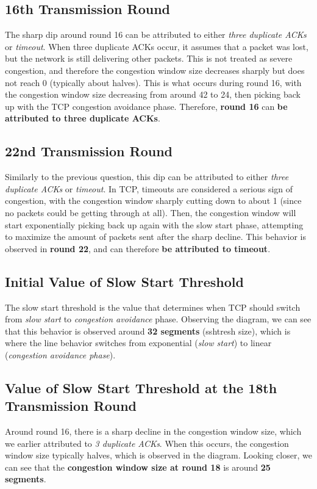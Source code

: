 \documentclass[colorlinks=true, allcolors=blue]{article}
\begin{document}
\subsection{16th Transmission Round}
The sharp dip around round 16 can be attributed to either \textit{three duplicate ACKs} or \textit{timeout}. When three duplicate ACKs occur, it assumes that a packet was lost, but the network is still delivering other packets. This is not treated as severe congestion, and therefore the congestion window size decreases sharply but does not reach 0 (typically about halves). This is what occurs during round 16, with the congestion window size decreasing from around 42 to 24, then picking back up with the TCP congestion avoidance phase. Therefore, \textbf{round 16} can \textbf{be attributed to three duplicate ACKs}.

\subsection{22nd Transmission Round}
Similarly to the previous question, this dip can be attributed to either \textit{three duplicate ACKs} or \textit{timeout}. In TCP, timeouts are considered a serious sign of congestion, with the congestion window sharply cutting down to about 1 (since no packets could be getting through at all). Then, the congestion window will start exponentially picking back up again with the slow start phase, attempting to maximize the amount of packets sent after the sharp decline. This behavior is observed in \textbf{round 22}, and can therefore \textbf{be attributed to timeout}.

\subsection{Initial Value of Slow Start Threshold}
The slow start threshold is the value that determines when TCP should switch from \textit{slow start} to \textit{congestion avoidance} phase. Observing the diagram, we can see that this behavior is observed around \textbf{32 segments} (sshtresh size), which is where the line behavior switches from exponential (\textit{slow start}) to linear (\textit{congestion avoidance phase}).

\subsection{Value of Slow Start Threshold at the 18th Transmission Round}
Around round 16, there is a sharp decline in the congestion window size, which we earlier attributed to \textit{3 duplicate ACKs}. When this occurs, the congestion window size typically halves, which is observed in the diagram. Looking closer, we can see that the \textbf{congestion window size at round 18} is around \textbf{25 segments}.
\end{document}
